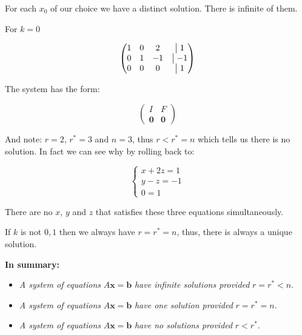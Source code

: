 \documentclass[
  letterpaper,
  DIV=11,
  numbers=noendperiod]{scrartcl}
\theoremstyle{definition}
\theoremstyle{remark}
\begin{document}
For each \(x_0\) of our choice we have a distinct solution. There is
infinite of them.

For \(k=0\)

\[
\begin{pmatrix} 1 & 0 & 2  &\bigm|1\\ 0 & 1 & -1 &\bigm|-1\\ 0 & 0 & 0 &\bigm| 1 \end{pmatrix} 
\]

The system has the form:

\[
\begin{pmatrix}
I & F\\
\mathbf{0} &\mathbf{0}
\end{pmatrix}
\]

And note: \(r=2\), \(r^*=3\) and \(n=3\), thus \(r<r^*=n\) which tells
us there is no solution. In fact we can see why by rolling back to:

\[
\begin{cases}
x+2z=1\\
y-z =-1\\
0=1
\end{cases}
\]

There are no \(x\), \(y\) and \(z\) that satisfies these three equations
simultaneously.

If \(k\) is not \(0,1\) then we always have \(r=r^*=n\), thus, there is
always a unique solution.

\textbf{In summary:}

\begin{itemize}
\item
  \emph{A system of equations} \(A\mathbf{x}=\mathbf{b}\) \emph{have
  infinite solutions provided} \(r=r^*<n\).
\item
  \emph{A system of equations} \(A\mathbf{x}=\mathbf{b}\) \emph{have one
  solution provided} \(r=r^*=n\).
\item
  \emph{A system of equations} \(A\mathbf{x}=\mathbf{b}\) \emph{have no
  solutions provided} \(r<r^*\).
\end{itemize}
\end{document}
